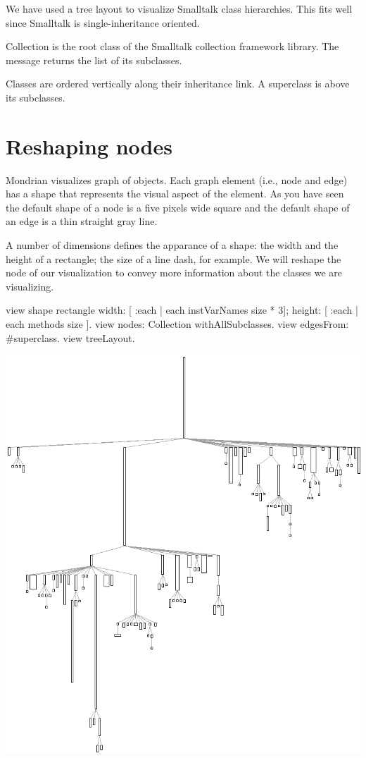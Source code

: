 \documentclass[a4paper,10pt,twoside]{book}
\begin{document}
We have used a tree layout to visualize Smalltalk class hierarchies. This fits well since Smalltalk is single-inheritance oriented.

Collection is the root class of the Smalltalk collection framework library. The message  returns the list of its subclasses.

Classes are ordered vertically along their inheritance link. A superclass is above its subclasses. 

\section{Reshaping nodes}

Mondrian visualizes graph of objects. Each graph element (i.e., node and edge) has a shape that represents the visual aspect of the element. As you have seen the default shape of a node is a five pixels wide square and the default shape of an edge is a thin straight gray line.

A number of dimensions defines the apparance of a shape: the width and the height of a rectangle; the size of a line dash, for example. We will reshape the node of our visualization to convey more information about the classes we are visualizing.

\begin{code}{}
view shape rectangle
  width: [ :each | each instVarNames size * 3];
  height: [ :each | each methods size ].
view nodes: Collection withAllSubclasses.
view edgesFrom: #superclass.
view treeLayout.
\end{code}
\begin{center}\includegraphics[scale=0.4]{picture5}\end{center}
\end{document}
